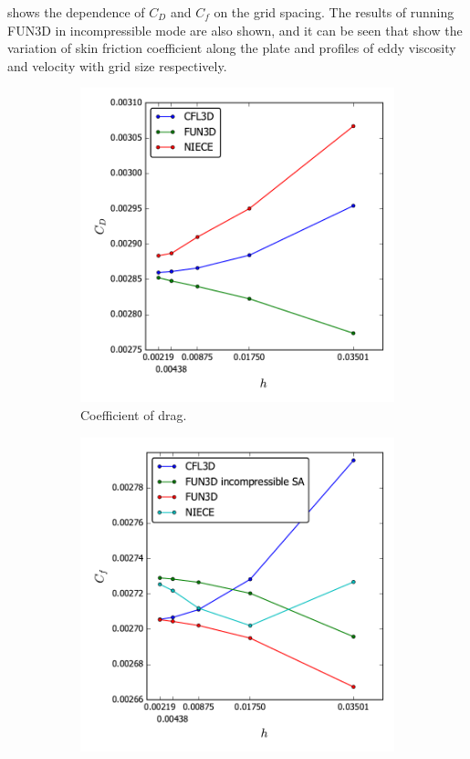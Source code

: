  shows the dependence of $C_D$ and $C_f$ on the grid spacing.  The results of running FUN3D in incompressible mode are also shown, and it can be seen that   show the variation of skin friction coefficient along the plate and profiles of eddy viscosity and velocity with grid size respectively.
\begin{figure}[ht!]
\centering
\begin{subfigure}{.45\textwidth}
  \centering
  \includegraphics[width=1.0\textwidth]{figs/flatnx/cd_convergence.pdf}
  \caption{Coefficient of drag.}
\end{subfigure}%
\begin{subfigure}{.45\textwidth}
  \centering
  \includegraphics[width=1.0\textwidth]{figs/flatnx/cf_convergence.pdf}

\end{subfigure}
\end{figure}
